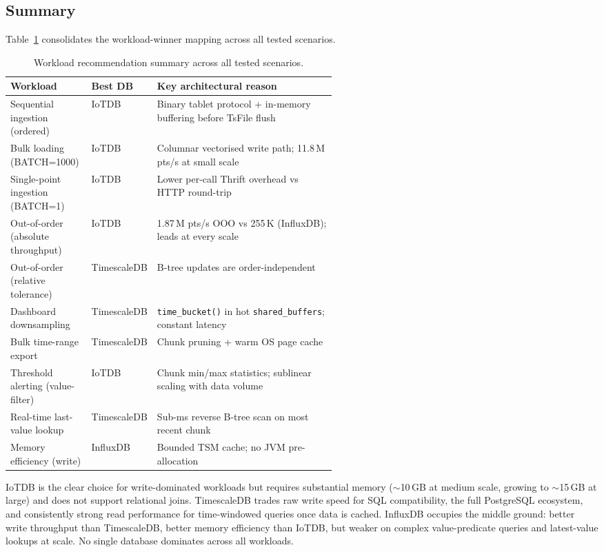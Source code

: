 \subsection{Summary}
\label{sec:results-summary}

Table~\ref{tab:summary} consolidates the workload-winner mapping across all tested scenarios.

\begin{table}[t]
  \centering
  \caption{Workload recommendation summary across all tested scenarios.}
  \footnotesize
  \label{tab:summary}
  \begin{tabular}{l l p{0.55\linewidth}}
    \hline
    \textbf{Workload} & \textbf{Best DB} & \textbf{Key architectural reason} \\
    \hline
    Sequential ingestion (ordered)     & IoTDB       & Binary tablet protocol + in-memory buffering before TsFile flush \\
    Bulk loading (BATCH=1000)          & IoTDB       & Columnar vectorised write path; 11.8\,M pts/s at small scale \\
    Single-point ingestion (BATCH=1)   & IoTDB       & Lower per-call Thrift overhead vs HTTP round-trip \\
    Out-of-order (absolute throughput) & IoTDB       & 1.87\,M pts/s OOO vs 255\,K (InfluxDB); leads at every scale \\
    Out-of-order (relative tolerance)  & TimescaleDB & B-tree updates are order-independent \\
    Dashboard downsampling             & TimescaleDB & \texttt{time\_bucket()} in hot \texttt{shared\_buffers}; constant latency \\
    Bulk time-range export             & TimescaleDB & Chunk pruning + warm OS page cache \\
    Threshold alerting (value-filter)  & IoTDB       & Chunk min/max statistics; sublinear scaling with data volume \\
    Real-time last-value lookup        & TimescaleDB & Sub-ms reverse B-tree scan on most recent chunk \\
    Memory efficiency (write)          & InfluxDB    & Bounded TSM cache; no JVM pre-allocation \\
    \hline
  \end{tabular}
\end{table}

IoTDB is the clear choice for write-dominated workloads but requires substantial memory
($\sim$10\,GB at medium scale, growing to $\sim$15\,GB at large) and does not support
relational joins. TimescaleDB trades raw write speed for SQL compatibility, the full
PostgreSQL ecosystem, and consistently strong read performance for time-windowed queries
once data is cached. InfluxDB occupies the middle ground: better write throughput than
TimescaleDB, better memory efficiency than IoTDB, but weaker on complex value-predicate
queries and latest-value lookups at scale. No single database dominates across all workloads.
